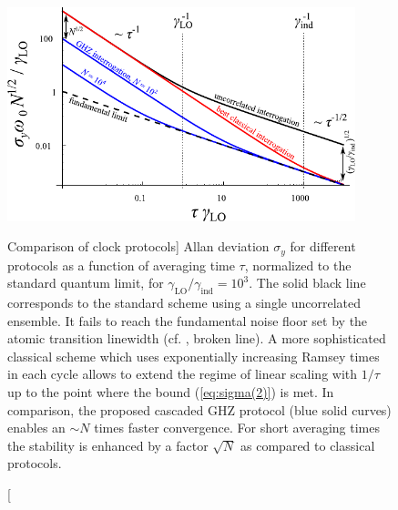 \begin{figure}
\centering 
\includegraphics[width=0.9\textwidth]{./figs_Kessler2014/fig1.pdf}
\caption
[Comparison of clock protocols] 
{
\label{fig:sigma_tau}
Allan deviation $\sigma_y$ for different protocols as a function of averaging
time $\tau$, normalized to the standard quantum limit, for $\gamma_\mathrm{LO} /
\gamma_\mathrm{ind} = 10^3$. The solid black line corresponds to the standard scheme using
a single uncorrelated ensemble. It fails to reach the fundamental noise floor
set by the atomic transition linewidth (cf. , broken line).
A more sophisticated classical scheme which uses exponentially increasing Ramsey
times in each cycle \cite{Rosenband2013, Borregaard2013} allows to extend the
regime of linear scaling with $1/\tau$ up to the point where the bound
(\ref{eq:sigma(2)}) is met. In comparison, the proposed cascaded GHZ protocol
(blue solid curves) enables an $\sim N$ times faster convergence. For short
averaging times the stability is enhanced by a factor $\sqrt{N}$ as compared to
classical protocols.
}
\end{figure} 


